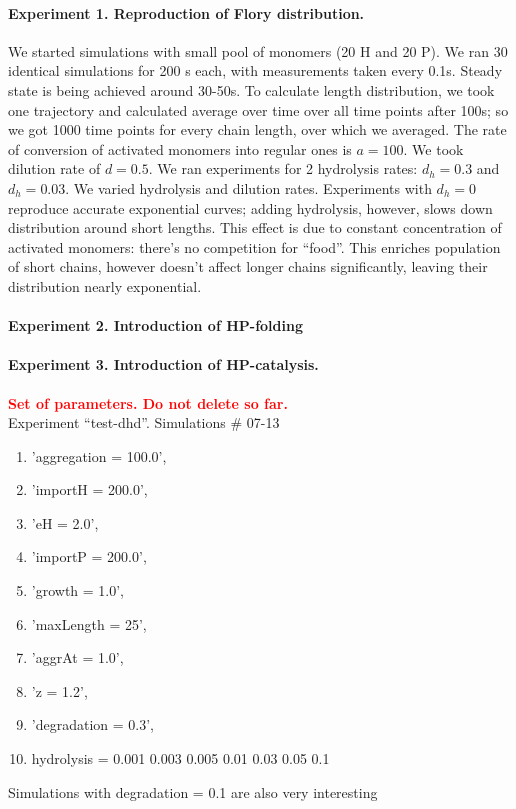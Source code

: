 \documentclass[journal=jacsat,manuscript=article,layout=twocolumn]{achemso}
\newcommand*{\red}[1]{\textcolor{red}{#1}}
\begin{document}
\paragraph{Experiment 1. Reproduction of Flory distribution.}\label{sec:expt1}
We started simulations with small pool of monomers (20 H and 20 P). We ran 30 identical  
simulations for 200 s each, with measurements taken every 0.1s. Steady state is being achieved 
around 30-50s. To calculate length distribution, we took one trajectory and calculated average 
over time over all time points after 100s; so we got 1000 time points for every chain length, over 
which we averaged. The rate of conversion of activated monomers into regular ones is $a=100$. We 
took dilution rate of $d=0.5$. We ran experiments for 2 hydrolysis rates: $d_h=0.3$ and $d_h=0.03$.
We varied hydrolysis and dilution rates. Experiments with $d_h=0$ reproduce accurate exponential 
curves; adding hydrolysis, however, slows down distribution around short lengths. This effect is 
due to constant concentration of activated monomers: there's no competition for ``food''. This 
enriches population of short chains, however doesn't affect longer chains significantly, leaving 
their distribution nearly exponential.

\paragraph{Experiment 2. Introduction of HP-folding}



\paragraph{Experiment 3. Introduction of HP-catalysis.}
\textbf{\red{Set of parameters. Do not delete so far.} }\\
Experiment ``test-dhd''. Simulations \# 07-13
\begin{enumerate}
 \item 'aggregation = 100.0',
 \item  'importH = 200.0',
\item   'eH = 2.0',
\item   'importP = 200.0',
  \item 'growth = 1.0',
  \item 'maxLength = 25',
  \item 'aggrAt = 1.0',
\item 'z = 1.2',
  \item 'degradation = 0.3',
  \item hydrolysis = 0.001 0.003 0.005 0.01 0.03 0.05 0.1
\end{enumerate}
Simulations with degradation = 0.1 are also very interesting
\end{document}
